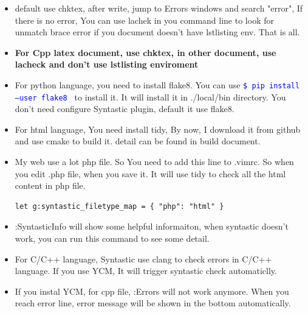 \documentclass[a4paper,12pt,twoside]{book}
\newcommand{\linuxcommand}[1]{\texttt{\textcolor{blue}{\$ #1 \Pisymbol{psy}{191}}}}
\begin{document}
\begin{itemize}
		\item default use chktex, after write, jump to Errors windows and search "error", If there is no error, You can use lachek in you command line to look for unmatch brace error if you document doesn't have lstlisting env. That is all.

		\item \textbf{For Cpp latex document, use chktex, in other document, use lacheck and don't use lstlisting enviroment}

		\item For python language, you need to install flake8. You can use \linuxcommand{pip install --user flake8} to install it. It will install it in ./local/bin directory. You don't need configure Syntastic plugin, default it use flake8.

		\item For html language, You need install tidy, By now, I download it from github and use cmake to build it. detail can be found in build document. 

		\item My web use a lot php file. So You need to add this line to .vimrc. So when you edit .php file, when you save it. It will use tidy to check all the html content in php file.
\begin{verbatim}
let g:syntastic_filetype_map = { "php": "html" }
\end{verbatim}

		\item :SyntasticInfo will show some helpful informaiton, when syntastic doesn't work, you can run this command to see some detail. 

		\item For C/C++ language, Syntastic use clang to check errors in C/C++ language. If you use YCM, It will trigger syntastic check automaticlly.

		\item If you instal YCM, for cpp file, :Errors will not work anymore. When you reach error line, error message will be shown in the bottom automatically. 

\end{itemize}
\end{document}
